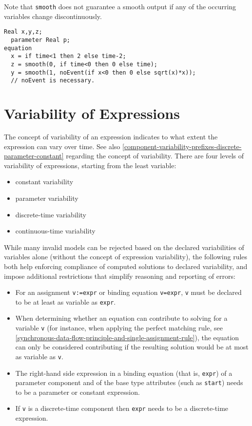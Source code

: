 \begin{nonnormative}
Note that \lstinline!smooth! does not guarantee a smooth output if any of the occurring variables change discontinuously.
\end{nonnormative}

\begin{example}
\begin{lstlisting}[language=modelica]
  Real x,y,z;
  parameter Real p;
equation
  x = if time<1 then 2 else time-2;
  z = smooth(0, if time<0 then 0 else time);
  y = smooth(1, noEvent(if x<0 then 0 else sqrt(x)*x));
  // noEvent is necessary.
\end{lstlisting}
\end{example}

\section{Variability of Expressions}

The concept of variability of an expression indicates to what extent the
expression can vary over time. See also \autoref{component-variability-prefixes-discrete-parameter-constant} regarding the
concept of variability. There are four levels of variability of
expressions, starting from the least variable:
\begin{itemize}
\item
  constant variability
\item
  parameter variability
\item
  discrete-time variability
\item
  continuous-time variability
\end{itemize}

While many invalid models can be rejected based on the declared variabilities of variables alone (without the concept of expression
variability), the following rules both help enforcing compliance of computed solutions to declared variability, and impose additional
restrictions that simplify reasoning and reporting of errors:
\begin{itemize}
\item
  For an assignment \lstinline!v:=expr! or binding equation \lstinline!v=expr!, \lstinline!v! must be declared
  to be at least as variable as \lstinline!expr!.
\item
  When determining whether an equation can contribute to solving for a variable \lstinline!v! (for instance,
  when applying the perfect matching rule, see \autoref{synchronous-data-flow-principle-and-single-assignment-rule}),
  the equation can only be considered contributing if the resulting solution would be at most as variable as \lstinline!v!.
\item
  The right-hand side expression in a binding equation (that is, \lstinline!expr!) of a parameter component and of the base type attributes
  (such as \lstinline!start!) needs to be a parameter or constant expression.
\item
  If \lstinline!v! is a discrete-time component then \lstinline!expr! needs to be a
  discrete-time expression.
\end{itemize}

